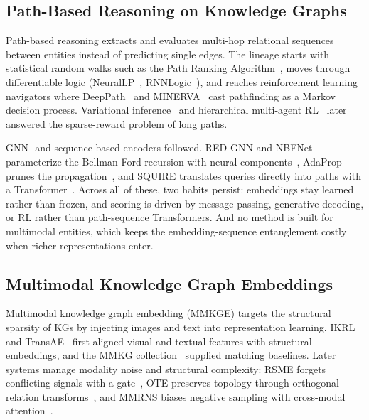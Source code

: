 \documentclass[runningheads]{llncs}
\begin{document}
\subsection{Path-Based Reasoning on Knowledge Graphs}
\label{sec:rw-path-reasoning}

Path-based reasoning extracts and evaluates multi-hop relational sequences between entities instead of predicting single edges. The lineage starts with statistical random walks such as the Path Ranking Algorithm~\cite{lao2011random}, moves through differentiable logic (NeuralLP~\cite{yang2017differentiable}, RNNLogic~\cite{qu2021rnnlogic}), and reaches reinforcement learning navigators where DeepPath~\cite{xiong2017deeppath} and MINERVA~\cite{das2018go} cast pathfinding as a Markov decision process. Variational inference~\cite{chen2018variational} and hierarchical multi-agent RL~\cite{zhang2022learning} later answered the sparse-reward problem of long paths.

GNN- and sequence-based encoders followed. RED-GNN and NBFNet parameterize the Bellman-Ford recursion with neural components~\cite{zhang2022knowledge,zhu2021neural}, AdaProp prunes the propagation~\cite{zhang2023adaprop}, and SQUIRE translates queries directly into paths with a Transformer~\cite{bai2022squire}. Across all of these, two habits persist: embeddings stay learned rather than frozen, and scoring is driven by message passing, generative decoding, or RL rather than path-sequence Transformers. And no method is built for multimodal entities, which keeps the embedding-sequence entanglement costly when richer representations enter.

\subsection{Multimodal Knowledge Graph Embeddings}
\label{sec:rw-mmkge}

Multimodal knowledge graph embedding (MMKGE) targets the structural sparsity of KGs by injecting images and text into representation learning. IKRL~\cite{xie2017image} and TransAE~\cite{wang2019transae} first aligned visual and textual features with structural embeddings, and the MMKG collection~\cite{liu2019mmkg} supplied matching baselines. Later systems manage modality noise and structural complexity: RSME forgets conflicting signals with a gate~\cite{wang2021rsme}, OTE preserves topology through orthogonal relation transforms~\cite{tang2020orthogonal}, and MMRNS biases negative sampling with cross-modal attention~\cite{xu2022multimodal}.
\end{document}
